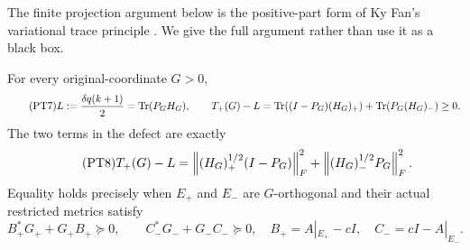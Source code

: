 The finite projection argument below is the positive-part form of
Ky Fan's variational trace principle \cite{a03pt:fan}. We give the full
argument rather than use it as a black box.

\begin{theorem}
For every original-coordinate \(G>0\),
\begin{equation}\tag{PT7}
 L:=\frac{\delta q(k+1)}2=\operatorname{Tr}(P_GH_G),\qquad
 T_+(G)-L
 =\operatorname{Tr}((I-P_G)(H_G)_+)+\operatorname{Tr}(P_G(H_G)_-)\ge0.
\end{equation}
The two terms in the defect are exactly
\begin{equation}\tag{PT8}
 T_+(G)-L
 =\left\lVert(H_G)_+^{1/2}(I-P_G)\right\rVert_F^2
   +\left\lVert(H_G)_-^{1/2}P_G\right\rVert_F^2.
\end{equation}
Equality holds precisely when \(E_+\) and \(E_-\) are
\(G\)-orthogonal and their actual restricted metrics satisfy
\begin{equation}\tag{PT9}
 B_+^*G_++G_+B_+\succeq0,\qquad
 C_-^*G_-+G_-C_-\succeq0,
 \quad B_+=A|_{E_+}-cI,\quad C_-=cI-A|_{E_-}.
\end{equation}
\end{theorem}
